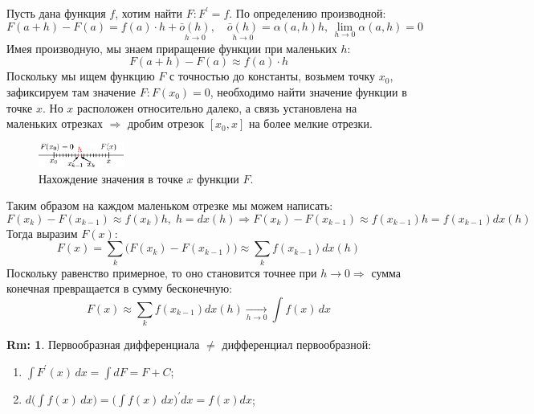 \documentclass[12pt]{article}
\theoremstyle{definition}
\newtheorem{rem}{Rm:}
\DeclareMathOperator{\dint}{\displaystyle\int}
\begin{document}
Пусть дана функция $f$, хотим найти $F\colon F^\prime = f$. По определению производной: 
$$
	F(a+h) - F(a) = f(a){\cdot}h + \underset{h \to 0}{\bar{o}(h)}, \quad \underset{h \to 0}{\bar{o}(h)}  = \alpha(a,h)h, \, \lim\limits_{h \to 0}\alpha(a,h) = 0
$$
Имея производную, мы знаем приращение функции при маленьких $h$: 
$$
	F(a+h) - F(a) \approx f(a){\cdot}h
$$
Поскольку мы ищем функцию $F$ с точностью до константы, возьмем точку $x_0$, зафиксируем там значение $F \colon F(x_0) = 0$, необходимо найти значение функции в точке $x$. Но $x$ расположен относительно далеко, а связь установлена на маленьких отрезках $\Rightarrow$ дробим отрезок $[x_0,x]$ на более мелкие отрезки.
\begin{figure}[H]
	\centering
	\includegraphics[width=0.25\textwidth]{1_1.eps}
	\caption{Нахождение значения в точке $x$ функции $F$.}
	\label{1_1}
\end{figure}
Таким образом на каждом маленьком отрезке мы можем написать: 
$$
	F(x_k) - F(x_{k-1}) \approx f(x_k)h, \; h = dx(h) \Rightarrow F(x_k) - F(x_{k-1}) \approx f(x_{k-1})h = f(x_{k-1})dx(h)
$$
Тогда выразим $F(x)$:
$$F(x) = \sum\limits_k \Big(F(x_k) - F(x_{k-1}) \Big) \approx \sum\limits_k f(x_{k-1})dx(h)$$
Поскольку равенство примерное, то оно становится точнее при $h \to 0 \Rightarrow$ сумма конечная превращается в сумму бесконечную: 
$$F(x) \approx \sum\limits_k f(x_{k-1})dx(h) \xrightarrow[h \to 0]{} \int f(x)\,dx$$

\begin{rem} Первообразная дифференциала $\neq$ дифференциал первообразной:
	\begin{enumerate}[label={(\arabic*)}]
		\item $\dint F^\prime(x)\,dx = \dint dF = F + C$;
		\item $d\bigg(\dint f(x)\,dx\bigg) = \bigg(\dint f(x)\,dx\bigg)^\prime dx = f(x) dx$;
	\end{enumerate}
\end{rem}
\end{document}
